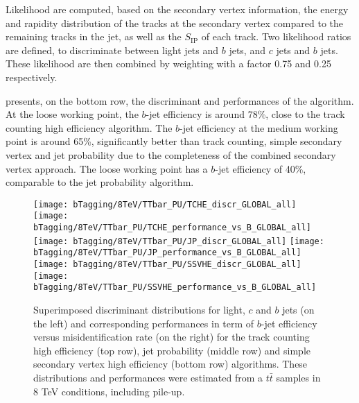     Likelihood are computed, based on the secondary vertex information, the energy
    and rapidity distribution of the tracks at the secondary vertex compared to the remaining
    tracks in the jet, as well as the $S_\text{IP}$ of each track. Two likelihood ratios
    are defined, to discriminate between light jets and $b$ jets, and $c$ jets and $b$ jets.
    These likelihood are then combined by weighting with a factor 0.75 and 0.25 respectively.

     presents, on the bottom row, the discriminant and
    performances of the algorithm. At the loose working point, the $b$-jet efficiency is
    around 78\%, close to the track counting high efficiency algorithm. The $b$-jet efficiency
    at the medium working point is around 65\%, significantly better than track counting,
    simple secondary vertex and jet probability due to the completeness of the combined
    secondary vertex approach. The loose working point has a $b$-jet efficiency of 40\%,
    comparable to the jet probability algorithm.

    \begin{figure}[th!]
        \centering
        \begin{minipage}{\textwidth}
        \texttt{[image: bTagging/8TeV/TTbar\_PU/TCHE\_discr\_GLOBAL\_all]}
        \texttt{[image: bTagging/8TeV/TTbar\_PU/TCHE\_performance\_vs\_B\_GLOBAL\_all]}\\
        \texttt{[image: bTagging/8TeV/TTbar\_PU/JP\_discr\_GLOBAL\_all]}
        \texttt{[image: bTagging/8TeV/TTbar\_PU/JP\_performance\_vs\_B\_GLOBAL\_all]}\\
        \texttt{[image: bTagging/8TeV/TTbar\_PU/SSVHE\_discr\_GLOBAL\_all]}
        \texttt{[image: bTagging/8TeV/TTbar\_PU/SSVHE\_performance\_vs\_B\_GLOBAL\_all]}\\
        \end{minipage}
        \caption{Superimposed discriminant distributions for light, $c$ and $b$ jets (on
        the left) and corresponding performances in term of $b$-jet efficiency versus
        misidentification rate (on the right) for the track counting high efficiency
        (top row), jet probability (middle row) and simple secondary vertex high efficiency
        (bottom row) algorithms. These distributions and performances were estimated from
        a $t\bar{t}$ samples in 8 TeV conditions, including pile-up.}
        \label{fig:bTagging/perfTCandJPandSSV}
    \end{figure}

